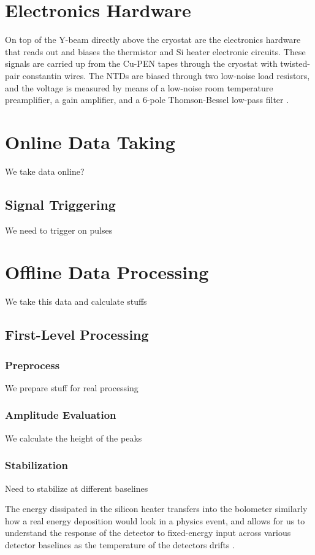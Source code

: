 \section{Electronics Hardware}
\label{sec:Electronics Hardware}
On top of the Y-beam directly above the cryostat are the electronics hardware that reads out and biases the thermistor and Si heater electronic circuits.
These signals are carried up from the Cu-PEN tapes through the cryostat with twisted-pair constantin wires.
The NTDs are biased through two low-noise load resistors, and the voltage is measured by means of a low-noise room temperature preamplifier, a gain amplifier, and a 6-pole Thomson-Bessel low-pass filter \cite{doi:10.1063/1.4936269, PESSINA2000132, ARNABOLDI2010327}.
\section{Online Data Taking}
\label{sec:Online Data Taking}
We take data online?
\subsection*{Signal Triggering}
We need to trigger on pulses
\section{Offline Data Processing}
We take this data and calculate stuffs
\subsection{First-Level Processing}
\subsubsection{Preprocess}
We prepare stuff for real processing
\subsubsection{Amplitude Evaluation}
We calculate the height of the peaks
\subsubsection{Stabilization}
Need to stabilize at different baselines
\label{ssec:Stabilization}

The energy dissipated in the silicon heater transfers into the bolometer similarly how a real energy deposition would look in a physics event, and allows for us to understand the response of the detector to fixed-energy input across various detector baselines as the temperature of the detectors drifts \cite{ALESSANDRELLO1998454:Si-heater}.

